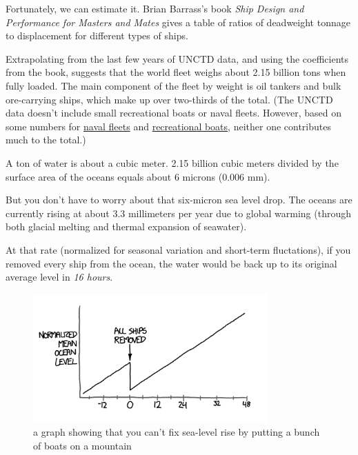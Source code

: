 {Fortunately, we can estimate it. Brian Barrass’s book \emph{Ship Design and Performance for Masters and Mates} gives a table of ratios of deadweight tonnage to displacement for different types of ships.}

{Extrapolating from the last few years of UNCTD data, and using the coefficients from the book, suggests that the world fleet weighs about 2.15 billion tons when fully loaded. The main component of the fleet by weight is oil tankers and bulk ore-carrying ships, which make up over two-thirds of the total. (The UNCTD data doesn’t include small recreational boats or naval fleets. However, based on some numbers for \href{http://www.csbaonline.org/4Publications/PubLibrary/R.20090217.The\_US\_Navy\_Charti/R.20090217.The\_US\_Navy\_Charti.pdf}{naval fleets} and \href{http://nmma.net/assets/cabinets/Cabinet445/2011\_abstract\_preview.pdf} {recreational boats}, neither one contributes much to the total.)}

{A ton of water is about a cubic meter. 2.15 billion cubic meters divided by the surface area of the oceans equals about 6 microns (0.006 mm).}

{But you don’t have to worry about that six-micron sea level drop. The oceans are currently rising at about 3.3 millimeters per year due to global warming (through both glacial melting and thermal expansion of seawater).}

{At that rate (normalized for seasonal variation and short-term fluctations), if you removed every ship from the ocean, the water would be back up to its original average level in \emph{16 hours}.}

\begin{figure}[!htbp]
\centering
\includegraphics[scale=0.5, max width=0.8\textwidth]{imgs/a/33/ships_graph.png}
\caption{a graph showing that you can't fix sea-level rise by putting a bunch of boats on a mountain}
\end{figure}

